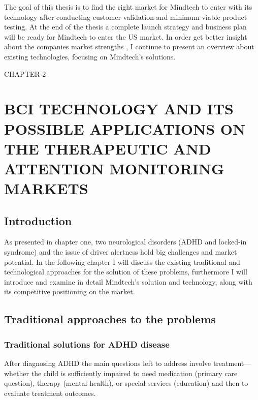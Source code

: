 \documentclass[letterpaper,10pt]{article}
\let\oldsection\section
\let\oldsubsection\subsection
\renewcommand{\section}{\def\cursectioning{section}\oldsection}
\renewcommand{\subsection}{\def\cursectioning{subsection}\oldsubsection}
\begin{document}
The goal of this thesis is to find the right market for Mindtech to enter with its technology after conducting  customer validation and minimum viable product testing. At the end of the thesis a complete launch strategy and business plan will be ready for Mindtech to enter the US market.
In order get better insight about the companies market strengths , I continue to present an overview about existing technologies, focusing on Mindtech's solutions. 





\newpage
\vspace{100mm}
\begin{center}
\uppercase{\Large{Chapter 2}}
\section{\uppercase{\large{BCI TECHNOLOGY AND ITS POSSIble applications on the therapeutic and attention monitoring markets}}} %
\vspace{20mm}
\end{center}


\subsection{Introduction}


As presented in chapter one,  two neurological disorders (ADHD and locked-in syndrome) and the issue of driver alertness hold big challenges and market potential. In the following chapter I will discuss the existing traditional and technological approaches  for the solution of these problems, furthermore I will introduce and examine in detail Mindtech's solution and technology, along with its competitive positioning on the market.

\subsection{Traditional approaches to the problems}


\subsubsection{Traditional solutions for ADHD disease}

After diagnosing ADHD the main questions left to address involve treatment—whether the child is sufficiently impaired to need medication (primary care question), therapy (mental health), or special services (education) and then to evaluate treatment outcomes. \cite{pelham_fabiano_massetti_2005}
\end{document}
